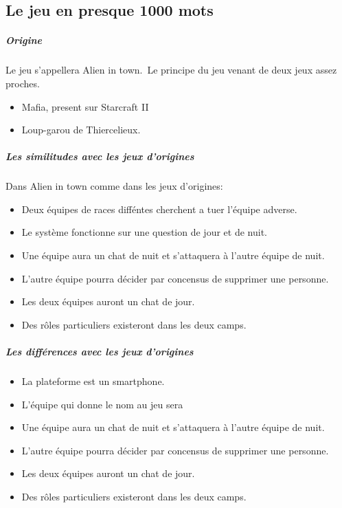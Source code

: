 \subsection{Le jeu en presque 1000 mots}
\subparagraph{Origine}
\textnormal{ Le jeu s'appellera Alien in town.\
Le principe du jeu venant de deux jeux assez proches.}
\begin{itemize}
\item \textnormal{Mafia, present sur Starcraft II}
\item \textnormal{Loup-garou de Thiercelieux.}
\end{itemize}
\subparagraph{Les similitudes avec les jeux d'origines}
\textnormal{ Dans Alien in town comme dans les jeux d'origines:}
\begin{itemize}
\item \textnormal{Deux équipes de races difféntes cherchent a tuer l'équipe adverse.}
\item \textnormal{Le système fonctionne sur une question de jour et de nuit.}
\item \textnormal{Une équipe aura un chat de nuit et s'attaquera à l'autre équipe de nuit.}
\item \textnormal{L'autre équipe pourra décider par concensus de supprimer une personne.}
\item \textnormal{Les deux équipes auront un chat de jour.}
\item \textnormal{Des rôles particuliers existeront dans les deux camps.}
\end{itemize}
\subparagraph{Les différences avec les jeux d'origines}
\begin{itemize}
\item \textnormal{La plateforme est un smartphone.}
\item \textnormal{L'équipe qui donne le nom au jeu sera }
\item \textnormal{Une équipe aura un chat de nuit et s'attaquera à l'autre équipe de nuit.}
\item \textnormal{L'autre équipe pourra décider par concensus de supprimer une personne.}
\item \textnormal{Les deux équipes auront un chat de jour.}
\item \textnormal{Des rôles particuliers existeront dans les deux camps.}
\end{itemize}


